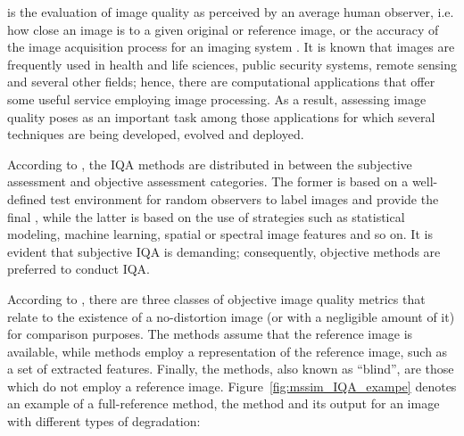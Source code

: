  is the evaluation of image quality as perceived by an average human observer, i.e. how close an image is to a given original or reference image, or the accuracy of the image acquisition process for an imaging system \cite{bovik2009essential}. It is known that images are frequently used in health and life sciences, public security systems, remote sensing and several other fields; hence, there are computational applications that offer some useful service employing image processing. As a result, assessing image quality poses as an important task among those applications for which several techniques are being developed, evolved and deployed.

According to , the IQA methods are distributed in between the subjective assessment and objective assessment categories. The former is based on a well-defined test environment for random observers to label images and provide the final , while the latter is based on the use of strategies such as statistical modeling, machine learning, spatial or spectral image features and so on. It is evident that subjective IQA is demanding; consequently, objective methods are preferred to conduct IQA.

According to , there are three classes of objective image quality metrics that relate to the existence of a no-distortion image (or with a negligible amount of it) for comparison purposes. The  methods assume that the reference image is available, while  methods employ a representation of the reference image, such as a set of extracted features. Finally, the  methods, also known as ``blind'', are those which do not employ a reference image. Figure~\ref{fig:mssim_IQA_exampe} denotes an example of a full-reference method, the  method and its output for an image with different types of degradation:

